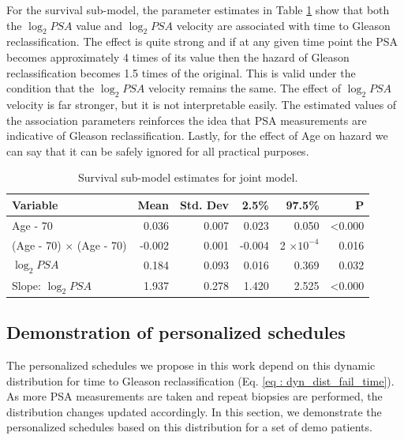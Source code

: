 For the survival sub-model, the parameter estimates in Table \ref{tab : PSA_survival} show that both the $\log_2 PSA$ value and $\log_2 PSA$ velocity are associated with time to Gleason reclassification. The effect is quite strong and if at any given time point the PSA becomes approximately 4 times of its value then the hazard of Gleason reclassification  becomes 1.5 times of the original. This is valid under the condition that the $\log_2 PSA$ velocity remains the same. The effect of $\log_2 PSA$ velocity is far stronger, but it is not interpretable easily. The estimated values of the association parameters reinforces the idea that PSA measurements are indicative of Gleason reclassification. Lastly, for the effect of Age on hazard we can say that it can be safely ignored for all practical purposes.

\begin{table}[!htb]
\centering
\caption{Survival sub-model estimates for joint model.}
\captionsetup{justification=centering}
\label{tab : PSA_survival}
\begin{tabular}{@{}lrrrrr@{}}
\toprule
Variable                      & Mean   & Std. Dev & 2.5\%  & 97.5\%                 & P              \\ \midrule
Age - 70                      & 0.036  & 0.007    & 0.023  & 0.050                  & \textless0.000 \\
(Age - 70) $\times$ (Age - 70) & -0.002 & 0.001    & -0.004 & 2 $\times 10^{-4}$ & 0.016          \\
$\log_2 PSA$                  & 0.184  & 0.093    & 0.016 & 0.369                  & 0.032          \\
Slope: $\log_2 PSA$           & 1.937  & 0.278    & 1.420  & 2.525                  & \textless0.000 \\ \bottomrule
\end{tabular}
\end{table}

\subsection{Demonstration of personalized schedules}
The personalized schedules we propose in this work depend on this dynamic distribution for time to Gleason reclassification (Eq. \ref{eq : dyn_dist_fail_time}). As more PSA measurements are taken and repeat biopsies are performed, the distribution changes updated accordingly. In this section, we demonstrate the personalized schedules based on this distribution for a set of demo patients.\\

